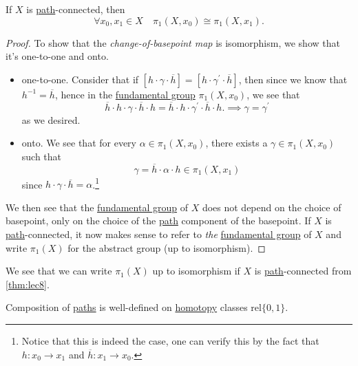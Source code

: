 \begin{theorem}\label{thm:lec8}
	If \(X\) is \hyperref[def:path]{path}-connected, then
	\[
		\forall x_0, x_1\in X\quad \pi_1(X, x_0)\cong \pi _1(X, x_1).
	\]
\end{theorem}
\begin{proof}
	\par To show that the \emph{change-of-basepoint map} is isomorphism, we show that it's one-to-one and onto.
	\begin{itemize}
		\item one-to-one. Consider that if \([h\cdot \gamma\cdot \overline{h} ] = [h\cdot \gamma ^\prime \cdot \overline{h} ]\), then since we know that \(h^{-1}  = \overline{h} \), hence
		      in the \hyperref[def:fundamental-group]{fundamental group} \(\pi _1(X, x_0)\), we see that
		      \[
			      \overline{h} \cdot h\cdot \gamma\cdot \overline{h} \cdot h = \overline{h} \cdot h\cdot \gamma ^\prime \cdot \overline{h} \cdot h. \implies \gamma = \gamma ^\prime
		      \]
		      as we desired.
		\item onto. We see that for every \(\alpha \in \pi_1(X, x_0)\), there exists a \(\gamma\in \pi_1(X, x_{0})\) such that
		      \[
			      \gamma = \overline{h} \cdot \alpha \cdot h\in \pi _1(X, x_1)
		      \]
		      since \(h\cdot \gamma\cdot \overline{h} =\alpha \).\footnote{Notice that this is indeed the case, one can verify this by the fact that \(h\colon x_{0}\to x_1\) and \(\overline{h} \colon x_1 \to x_0\).}
	\end{itemize}

	\par We then see that the \hyperref[def:fundamental-group]{fundamental group} of \(X\) does not depend on the choice of basepoint, only on the choice of the \hyperref[def:path]{path} component of the basepoint.
	If \(X\) is \hyperref[def:path]{path}-connected, it now makes sense to refer to \emph{the} \hyperref[def:fundamental-group]{fundamental group} of \(X\) and write \(\pi _1(X)\) for the abstract group (up to isomorphism).
\end{proof}
\begin{remark}
	We see that we can write \(\pi _1(X)\) up to isomorphism if \(X\) is \hyperref[def:path]{path}-connected from \autoref{thm:lec8}.
\end{remark}

\begin{exercise}
	Composition of \hyperref[def:path]{paths} is well-defined on \hyperref[def:homotopy]{homotopy} classes \hyperref[def:homotopy-relative]{\(\mathrm{rel} \{0, 1\}\)}.
\end{exercise}

